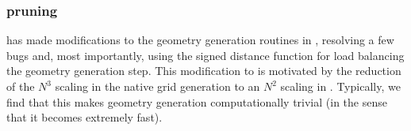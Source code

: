 \documentclass[letterpaper,10pt,english]{sphinxmanual}
\begin{document}
\subsubsection{ pruning}
\label{\detokenize{Source/SpatialDiscretization:chombo-discharge-pruning}}
 has made modifications to the geometry generation routines in , resolving a few bugs and, most importantly, using the signed distance function for load balancing the geometry generation step.
This modification to  is motivated by the reduction of the \(N^3\) scaling in the native  grid generation to an \(N^2\) scaling in .
Typically, we find that this makes geometry generation computationally trivial (in the sense that it becomes extremely fast).
\end{document}
